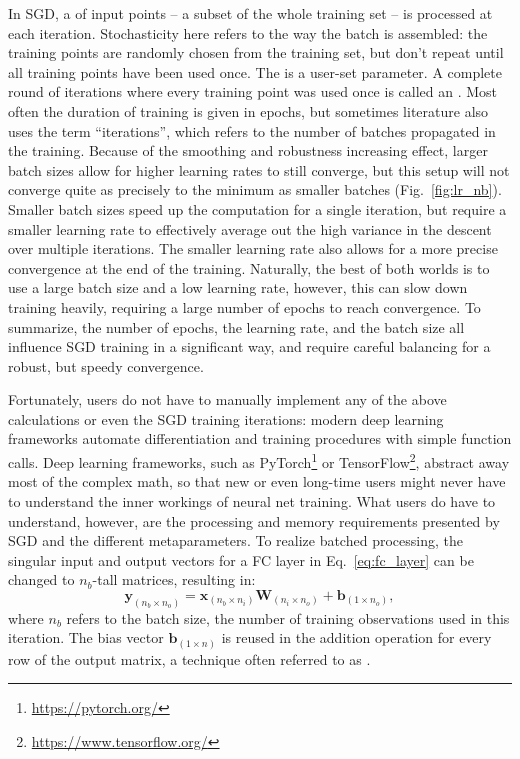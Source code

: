 			In \ac{SGD}, a  of input points -- a subset of the whole training set -- is processed at each iteration.
			Stochasticity here refers to the way the batch is assembled: the training points are randomly chosen from the training set, but don't repeat until all training points have been used once.
			The  is a user-set parameter.
			A complete round of iterations where every training point was used once is called an .
			Most often the duration of training is given in epochs, but sometimes literature also uses the term ``iterations'', which refers to the number of batches propagated in the training.
			Because of the smoothing and robustness increasing effect, larger batch sizes allow for higher learning rates to still converge, but this setup will not converge quite as precisely to the minimum as smaller batches (Fig.~\ref{fig:lr_nb}).
			Smaller batch sizes speed up the computation for a single iteration, but require a smaller learning rate to effectively average out the high variance in the descent over multiple iterations.
			The smaller learning rate also allows for a more precise convergence at the end of the training.
			Naturally, the best of both worlds is to use a large batch size and a low learning rate, however, this can slow down training heavily, requiring a large number of epochs to reach convergence.
			To summarize, the number of epochs, the learning rate, and the batch size all influence \ac{SGD} training in a significant way, and require careful balancing for a robust, but speedy convergence.
			
			Fortunately, users do not have to manually implement any of the above calculations or even the \ac{SGD} training iterations: modern deep learning frameworks automate differentiation and training procedures with simple function calls.
			Deep learning frameworks, such as PyTorch\footnote{\url{https://pytorch.org/}} or TensorFlow\footnote{\url{https://www.tensorflow.org/}}, abstract away most of the complex math, so that new or even long-time users might never have to understand the inner workings of neural net training.
			What users do have to understand, however, are the processing and memory requirements presented by \ac{SGD} and the different metaparameters.
			To realize batched processing, the singular input and output vectors for a \ac{FC} layer in Eq.~\ref{eq:fc_layer} can be changed to $n_b$-tall matrices, resulting in:
			\begin{equation}
				\mathbf{y}_{(n_b \times n_o)} = \mathbf{x}_{(n_b \times n_i)}\mathbf{W}_{(n_i \times n_o)} + \mathbf{b}_{(1 \times n_o)},
			\end{equation}
			\noindent where $n_b$ refers to the batch size, the number of training observations used in this iteration.
			The bias vector $\mathbf{b}_{(1 \times n)}$ is reused in the addition operation for every row of the output matrix, a technique often referred to as .
			
